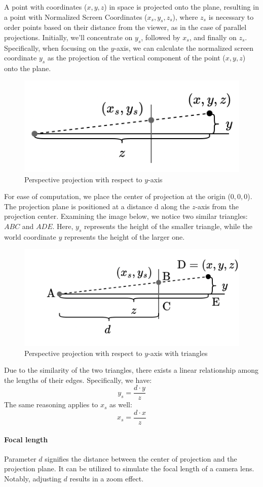 A point with coordinates ($x, y, z$) in space is projected onto the plane, resulting in a point with Normalized Screen Coordinates ($x_s, y_s, z_s$), where $z_s$ is necessary to order points based on their distance from the viewer, as in the case of parallel projections. 
Initially, we'll concentrate on $y_s$, followed by $x_s$, and finally on $z_s$.
Specifically, when focusing on the $y$-axis, we can calculate the normalized screen coordinate $y_s$ as the projection of the vertical component of the point ($x, y, z$) onto the plane.
\begin{figure}[H]
    \centering
    \includegraphics[width=0.5\linewidth]{images/perp.png}
    \caption{Perspective projection with respect to $y$-axis}
\end{figure}
For ease of computation, we place the center of projection at the origin ($0, 0, 0$). 
The projection plane is positioned at a distance d along the $z$-axis from the projection center. 
Examining the image below, we notice two similar triangles: $ABC$ and $ADE$. 
Here, $y_s$ represents the height of the smaller triangle, while the world coordinate $y$ represents the height of the larger one.
\begin{figure}[H]
    \centering
    \includegraphics[width=0.5\linewidth]{images/perp1.png}
    \caption{Perspective projection with respect to $y$-axis with triangles}
\end{figure}
Due to the similarity of the two triangles, there exists a linear relationship among the lengths of their edges. 
Specifically, we have:
\[y_s=\dfrac{d\cdot y}{z}\]
The same reasoning applies to $x_s$ as well:
\[x_s=\dfrac{d\cdot x}{z}\]

\paragraph*{Focal length}
Parameter $d$ signifies the distance between the center of projection and the projection plane. 
It can be utilized to simulate the focal length of a camera lens. 
Notably, adjusting $d$ results in a zoom effect.

